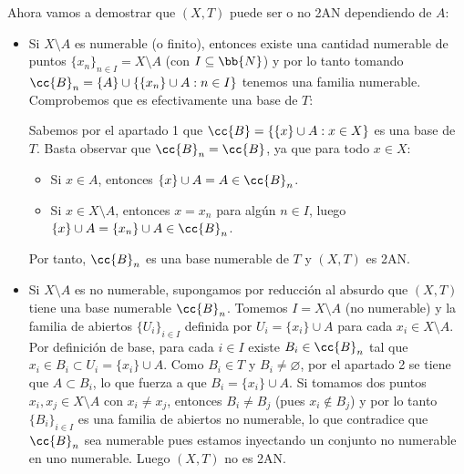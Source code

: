 \documentclass[12pt]{article}
\begin{document}
\begin{ejercicio}
\begin{enumerate}
        Ahora vamos a demostrar que $(X, T)$ puede ser o no 2AN dependiendo de $A$:
        \begin{itemize}
            \item Si $X\setminus A$ es numerable (o finito), entonces existe una cantidad numerable de puntos $\{x_n\}_{n\in I} = X\setminus A$ (con $I \subseteq \bb{N}$) y por lo tanto tomando $\cc{B}_n = \{A\} \cup \{\{x_n\}\cup A : n\in I\}$ tenemos una familia numerable. Comprobemos que es efectivamente una base de $T$:
            
            Sabemos por el apartado 1 que $\cc{B} = \{\{x\}\cup A : x\in X\}$ es una base de $T$. Basta observar que $\cc{B}_n = \cc{B}$, ya que para todo $x \in X$:
            \begin{itemize}
                \item Si $x \in A$, entonces $\{x\} \cup A = A \in \cc{B}_n$.
                \item Si $x \in X \setminus A$, entonces $x = x_n$ para algún $n \in I$, luego $\{x\} \cup A = \{x_n\} \cup A \in \cc{B}_n$.
            \end{itemize}
            Por tanto, $\cc{B}_n$ es una base numerable de $T$ y $(X, T)$ es 2AN.

            \item Si $X\setminus A$ es no numerable, supongamos por reducción al absurdo que $(X, T)$ tiene una base numerable $\cc{B}_n$. Tomemos $I = X \setminus A$ (no numerable) y la familia de abiertos $\{U_i\}_{i\in I}$ definida por $U_i = \{x_i\} \cup A$ para cada $x_i \in X\setminus A$. Por definición de base, para cada $i\in I$ existe $B_i \in \cc{B}_n$ tal que $x_i \in B_i \subset U_i = \{x_i\}\cup A$. Como $B_i \in T$ y $B_i \neq \varnothing$, por el apartado 2 se tiene que $A \subset B_i$, lo que fuerza a que $B_i = \{x_i\}\cup A$. Si tomamos dos puntos $x_i, x_j \in X\setminus A$ con $x_i \neq x_j$, entonces $B_i \neq B_j$ (pues $x_i \notin B_j$) y por lo tanto $\{B_i\}_{i\in I}$ es una familia de abiertos no numerable, lo que contradice que $\cc{B}_n$ sea numerable pues estamos inyectando un conjunto no numerable en uno numerable. Luego $(X, T)$ no es 2AN.
        \end{itemize}
        \end{enumerate}
    \end{ejercicio}
\end{document}
